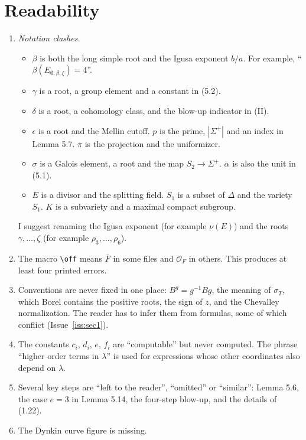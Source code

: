 \documentclass[12pt,letterpaper]{article}
\newcommand{\OF}{\mathcal{O}_F}
\newcommand{\ovF}{\overline{F}}
\theoremstyle{definition}
\begin{document}
\section{Readability}

\begin{enumerate}
\item \emph{Notation clashes.}
\begin{itemize}
\item $\beta$ is both the long simple root and the Igusa exponent $b/a$. For
example, ``$\beta(E_{\emptyset,\beta,\zeta})=4$''.
\item $\gamma$ is a root, a group element and a constant in (5.2).
\item $\delta$ is a root, a cohomology class, and the blow-up indicator in
(II).
\item $\epsilon$ is a root and the Mellin cutoff. $p$ is the prime, $|\Sigma^+|$
and an index in Lemma 5.7. $\pi$ is the projection and the uniformizer.
\item $\sigma$ is a Galois element, a root and the map $S_2\to\Sigma^+$.
$\alpha$ is also the unit in (5.1).
\item $E$ is a divisor and the splitting field. $S_1$ is a subset of $\Delta$
and the variety $S_1$. $K$ is a subvariety and a maximal compact subgroup.
\end{itemize}
I suggest renaming the Igusa exponent (for example $\nu(E)$) and the roots
$\gamma,\dots,\zeta$ (for example $\rho_3,\dots,\rho_6$).
\item The macro \verb|\off| means $\ovF$ in some files and $\OF$ in others.
This produces at least four printed errors.
\item Conventions are never fixed in one place: $B^g=g^{-1}Bg$, the meaning
of $\sigma_T$, which Borel contains the positive roots, the sign of $z$, and
the Chevalley normalization. The reader has to infer them from formulas, some
of which conflict (Issue~\ref{iss:sec1}).
\item The constants $c_i$, $d_i$, $e$, $f_i$ are ``computable'' but never
computed. The phrase ``higher order terms in $\lambda$'' is used for
expressions whose other coordinates also depend on $\lambda$.
\item Several key steps are ``left to the reader'', ``omitted'' or
``similar'': Lemma 5.6, the case $e=3$ in Lemma 5.14, the four-step blow-up,
and the details of (1.22).
\item The Dynkin curve figure is missing.
\end{enumerate}
\end{document}
